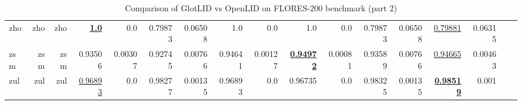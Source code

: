 \documentclass[11pt]{article}
\def\flores{FLORES\xspace}
\def\edin{OpenLID\xspace}
\begin{document}
\begin{table*}[h]
{\begin{tabular}{lrrrrrrrrrrrrrrrr}
zho         & zho         & zho         & \textbf{\underline{1.0}}         & 0.0         & 0.79873         & 0.06508         & 1.0         & 0.0         & 1.0         & 0.0         & 0.79873         & 0.06508         & \underline{0.79881}         & 0.06315         \\
zsm         & zsm         & zsm         & 0.93506         & 0.00307         & 0.92745         & 0.00766         & 0.94641         & 0.00127         & \textbf{\underline{0.94972}}         & 0.00081         & 0.93589         & 0.00766         & \underline{0.94665}         & 0.00463         \\
zul         & zul         & zul         & \underline{0.96893}         & 0.0         & 0.98277         & 0.00135         & 0.96893         & 0.0         & 0.96735         & 0.0         & 0.98325         & 0.00135         & \textbf{\underline{0.98519}}         & 0.001         \\
\end{tabular}
}
\caption{Comparison of GlotLID vs \edin on \flores-200 benchmark (part 2)}
\label{tab:appendix_glotlid_lid201_floress_2}
\end{table*}
 
\end{document}
